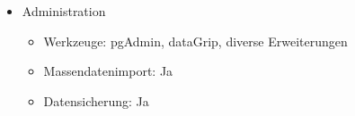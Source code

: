 \begin{itemize}
\begin{itemize}
        \end{itemize}
        \item Administration
        \begin{itemize}
            \item Werkzeuge: pgAdmin, dataGrip, diverse Erweiterungen
            \item Massendatenimport: Ja
            \item Datensicherung: Ja
        \end{itemize}
    \end{itemize}
\newpage
